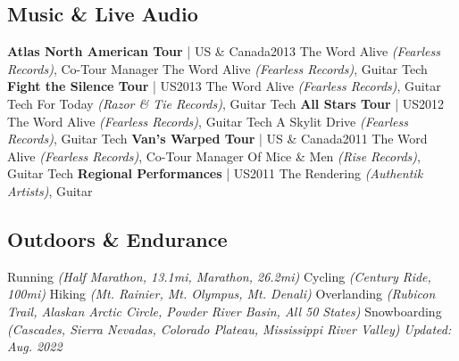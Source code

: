 \documentclass{article}
\begin{document}
    \subsection*{Music \& Live Audio}
        \textbf{Atlas North American Tour} | US \& Canada\hfill{2013}\newline
        The Word Alive \textit{(Fearless Records)}, Co-Tour Manager\newline
        The Word Alive \textit{(Fearless Records)}, Guitar Tech\newline\newline
        \textbf{Fight the Silence Tour} | US\hfill{2013}\newline
        The Word Alive \textit{(Fearless Records)}, Guitar Tech\newline
        For Today \textit{(Razor \& Tie Records)}, Guitar Tech\newline\newline
        \textbf{All Stars Tour} | US\hfill{2012}\newline
        The Word Alive \textit{(Fearless Records)}, Guitar Tech\newline
        A Skylit Drive \textit{(Fearless Records)}, Guitar Tech\newline\newline
        \textbf{Van's Warped Tour} | US \& Canada\hfill{2011}\newline
        The Word Alive \textit{(Fearless Records)}, Co-Tour Manager\newline
        Of Mice \& Men \textit{(Rise Records)}, Guitar Tech\newline\newline
        \textbf{Regional Performances} | US\hfill{2011}\newline
        The Rendering \textit{(Authentik Artists)}, Guitar
    \subsection*{Outdoors \& Endurance}
        Running \textit{(Half Marathon, 13.1mi, Marathon, 26.2mi)}\newline
        Cycling \textit{(Century Ride, 100mi)}\newline
        Hiking \textit{(Mt. Rainier, Mt. Olympus, Mt. Denali)}\newline
        Overlanding \textit{(Rubicon Trail, Alaskan Arctic Circle, Powder River Basin, All 50 States)}\newline
        Snowboarding \textit{(Cascades, Sierra Nevadas, Colorado Plateau, Mississippi River Valley)}\newline
        \mbox{}
        \vfill
        \hfill{}\textit{Updated: Aug. 2022}
\end{document}

